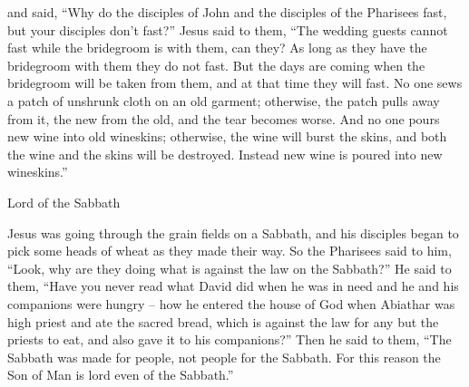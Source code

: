 {and
said,
“Why
do the disciples
of John
and
the disciples
of the Pharisees
fast,
but
your
disciples
don’t
fast?”
Jesus
said
to them,
“The wedding guests
cannot
fast
while the bridegroom
is
with
them,
can they? As long as
they have
the bridegroom
with
them
they do
not
fast.
But
the days
are coming
when
the bridegroom
will be taken
from
them,
and
at
that
time
they will fast.
No one
sews
a patch
of unshrunk
cloth
on
an old
garment;
otherwise,
the patch pulls away
from
it,
the new
from the old,
and
the tear
becomes
worse.
And
no one
pours
new
wine
into
old
wineskins;
otherwise,
the wine
will burst
the skins,
and
both the wine
and
the skins
will be destroyed.
Instead
new
wine
is poured into
new
wineskins.”
\par }{\SH Lord of the Sabbath
\par }{\PP {}Jesus was going
through
the grain fields
on
a Sabbath,
and
his
disciples
began
to pick
some heads of wheat
as they made
their way.
So
the Pharisees
said
to him,
“Look,
why
are they doing
what is
against the law
on the Sabbath?”
He
said
to them,
“Have you
never
read
what
David
did
when
he was
in need
and
he
and
his companions
were hungry –
how
he entered
the house
of God
when Abiathar
was high priest
and
ate
the sacred
bread,
which
is against the law
for any but
the priests
to eat,
and
also
gave
it to his companions?”
Then
he said
to them,
“The Sabbath
was made
for
people,
not
people
for
the Sabbath.
For this reason
the Son
of Man
is
lord
even
of the Sabbath.”

}
